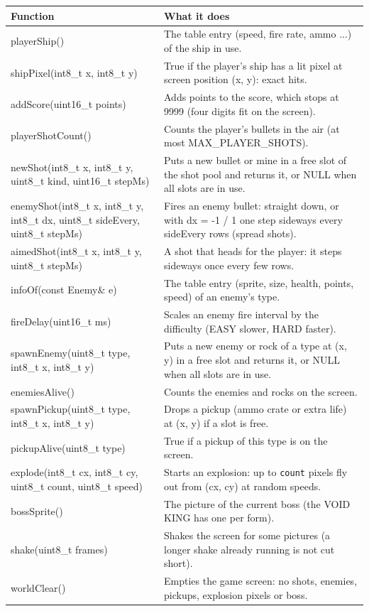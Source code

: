 \documentclass[11pt,a4paper]{article}
\begin{document}
{\footnotesize\begin{longtable}{|>{\raggedright\arraybackslash}p{5.82cm}|>{\raggedright\arraybackslash}p{10.68cm}|}
\hline\rowcolor{accent}\textbf{\color{white}Function} & \textbf{\color{white}What it does}\\\hline\endhead
playerShip() & The table entry (speed, fire rate, ammo ...) of the ship in use.\\\hline
\rowcolor{rowshade}shipPixel(int8\_t x, int8\_t y) & True if the player's ship has a lit pixel at screen position (x, y): exact hits.\\\hline
addScore(uint16\_t points) & Adds points to the score, which stops at 9999 (four digits fit on the screen).\\\hline
\rowcolor{rowshade}playerShotCount() & Counts the player's bullets in the air (at most MAX\_PLAYER\_SHOTS).\\\hline
newShot(int8\_t x, int8\_t y, uint8\_t kind, uint16\_t stepMs) & Puts a new bullet or mine in a free slot of the shot pool and returns it, or NULL when all slots are in use.\\\hline
\rowcolor{rowshade}enemyShot(int8\_t x, int8\_t y, int8\_t dx, uint8\_t sideEvery, uint8\_t stepMs) & Fires an enemy bullet: straight down, or with dx = -1 / 1 one step sideways every sideEvery rows (spread shots).\\\hline
aimedShot(int8\_t x, int8\_t y, uint8\_t stepMs) & A shot that heads for the player: it steps sideways once every few rows.\\\hline
\rowcolor{rowshade}infoOf(const Enemy\& e) & The table entry (sprite, size, health, points, speed) of an enemy's type.\\\hline
fireDelay(uint16\_t ms) & Scales an enemy fire interval by the difficulty (EASY slower, HARD faster).\\\hline
\rowcolor{rowshade}spawnEnemy(uint8\_t type, int8\_t x, int8\_t y) & Puts a new enemy or rock of a type at (x, y) in a free slot and returns it, or NULL when all slots are in use.\\\hline
enemiesAlive() & Counts the enemies and rocks on the screen.\\\hline
\rowcolor{rowshade}spawnPickup(uint8\_t type, int8\_t x, int8\_t y) & Drops a pickup (ammo crate or extra life) at (x, y) if a slot is free.\\\hline
pickupAlive(uint8\_t type) & True if a pickup of this type is on the screen.\\\hline
\rowcolor{rowshade}explode(int8\_t cx, int8\_t cy, uint8\_t count, uint8\_t speed) & Starts an explosion: up to \texttt{count} pixels fly out from (cx, cy) at random speeds.\\\hline
bossSprite() & The picture of the current boss (the VOID KING has one per form).\\\hline
\rowcolor{rowshade}shake(uint8\_t frames) & Shakes the screen for some pictures (a longer shake already running is not cut short).\\\hline
worldClear() & Empties the game screen: no shots, enemies, pickups, explosion pixels or boss.\\\hline
\end{longtable}}
\end{document}
